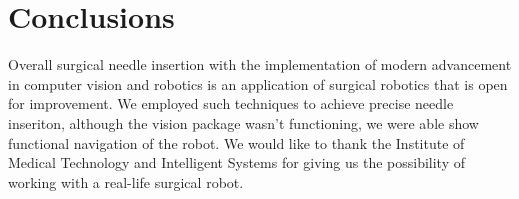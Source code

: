 \section{Conclusions}
Overall surgical needle insertion with the implementation of modern advancement in computer vision and robotics is an application of surgical robotics that is open for improvement. We employed such techniques to achieve precise needle inseriton, although the vision package wasn't functioning, we were able show functional navigation of the robot. We would like to thank the Institute of Medical Technology and Intelligent Systems for giving us the possibility of working with a real-life surgical robot.